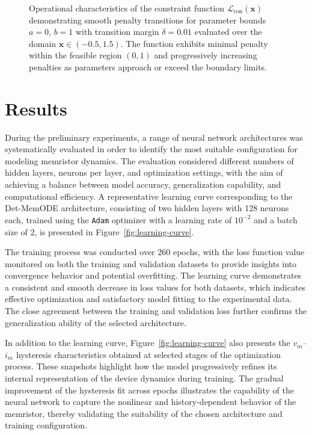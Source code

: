 \documentclass[lettersize,journal]{IEEEtran}
\begin{document}
\begin{figure}[!t]
  \centering
  \resizebox{2.5in}{!}{%
    
  }
  \caption{Operational characteristics of the constraint function \(\mathcal{L}_{\mathrm{con}}(\mathbf{x})\) demonstrating smooth penalty transitions for parameter bounds \(a=0\), \(b=1\) with transition margin \(\delta=0.01\) evaluated over the domain \(\mathbf{x} \in (-0.5, 1.5)\). The function exhibits minimal penalty within the feasible region \((0,1)\) and progressively increasing penalties as parameters approach or exceed the boundary limits.}
  \label{fig:constrains}
\end{figure}

\section{Results}
\noindent During the preliminary experiments, a range of neural network architectures was systematically evaluated in order to identify the most suitable configuration for modeling memristor dynamics. The evaluation considered different numbers of hidden layers, neurons per layer, and optimization settings, with the aim of achieving a balance between model accuracy, generalization capability, and computational efficiency. A representative learning curve corresponding to the Det-MemODE architecture, consisting of two hidden layers with 128 neurons each, trained using the \verb|Adam| optimizer with a learning rate of \(10^{-2}\) and a batch size of 2, is presented in Figure~\ref{fig:learning-curve}.

The training process was conducted over 260 epochs, with the loss function value monitored on both the training and validation datasets to provide insights into convergence behavior and potential overfitting. The learning curve demonstrates a consistent and smooth decrease in loss values for both datasets, which indicates effective optimization and satisfactory model fitting to the experimental data. The close agreement between the training and validation loss further confirms the generalization ability of the selected architecture.

In addition to the learning curve, Figure~\ref{fig:learning-curve} also presents the \(v_m\)--\(i_m\) hysteresis characteristics obtained at selected stages of the optimization process. These snapshots highlight how the model progressively refines its internal representation of the device dynamics during training. The gradual improvement of the hysteresis fit across epochs illustrates the capability of the neural network to capture the nonlinear and history-dependent behavior of the memristor, thereby validating the suitability of the chosen architecture and training configuration.
\end{document}
